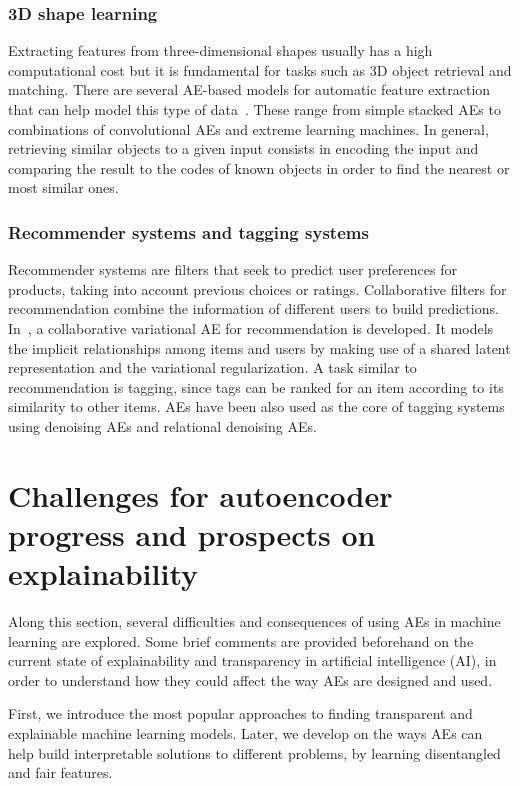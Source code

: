 \subsubsection{3D shape learning} Extracting features from three-dimen\-sional shapes usually has a high computational cost but it is fundamental for tasks such as 3D object retrieval and matching. There are several AE-based models for automatic feature extraction that can help model this type of data~. These range from simple stacked AEs to combinations of convolutional AEs and extreme learning machines. In general, retrieving similar objects to a given input consists in encoding the input and comparing the result to the codes of known objects in order to find the nearest or most similar ones.

\subsubsection{Recommender systems and tagging systems} Recommender systems are filters that seek to predict user preferences for products, taking into account previous choices or ratings. Collaborative filters for recommendation combine the information of different users to build predictions. In~, a collaborative variational AE for recommendation is developed. It models the implicit relationships among items and users by making use of a shared latent representation and the variational regularization. A task similar to recommendation is tagging, since tags can be ranked for an item according to its similarity to other items. AEs have been also used as the core of tagging systems~ using denoising AEs and relational denoising AEs.

\section{Challenges for autoencoder progress and prospects on explainability}\label{sec:ch}

Along this section, several difficulties and consequences of using AEs in machine learning are explored. Some brief comments are provided beforehand on the current state of explainability and transparency in artificial intelligence (AI), in order to understand how they could affect the way AEs are designed and used.

First, we introduce the most popular approaches to finding transparent and explainable machine learning models. Later, we develop on the ways AEs can help build interpretable solutions to different problems, by learning disentangled and fair features.

